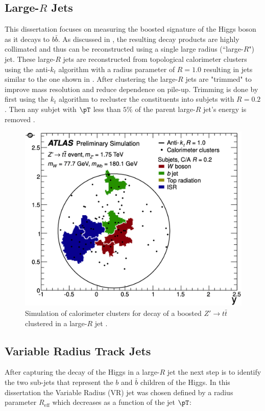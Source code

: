 \subsection{Large-$R$ Jets} \label{sec:objects:fatjet}
This dissertation focuses on measuring the boosted signature of the Higgs boson
as it decays to $b\bar{b}$.  As discussed in , the
resulting decay products are highly collimated and thus can be reconstructed
using a single large radius (``large-$R$") jet.  These large-$R$ jets are
reconstructed from topological calorimeter clusters using the anti-$k_{t}$
algorithm with a radius parameter of $R = 1.0$ resulting in jets similar to the
one shown in  \cite{Aaboud:2018kfi,
Aaboud:2017hdf}. After clustering the large-$R$ jets are "trimmed" to improve
mass resolution and reduce dependence on pile-up. Trimming is done by first
using the $k_{t}$ algorithm to recluster the constituents into subjets with
$R=0.2$.  Then any subjet with $\pT$ less than $5\%$ of the parent large-$R$
jet's energy is removed \cite{Krohn:2009th}.

\begin{figure}[!htbp]
  \centering
  \includegraphics[width=0.7\linewidth]{figures/objects/large_R_example}
  \caption{Simulation of calorimeter clusters for decay of a boosted $Z' \rightarrow t\bar{t}$ clustered in a large-$R$ jet \cite{ATLAS-CONF-2014-003}.}
  \label{sec:object:large_R_example}
\end{figure}

\subsection{Variable Radius Track Jets} \label {sec:objects:vrjets}

After capturing the decay of the Higgs in a large-$R$ jet the next step is to
identify the two sub-jets that represent the $b$ and $\bar{b}$ children of the
Higgs. In this dissertation the Variable Radius (VR) jet was chosen
\cite{Krohn:2009zg,ATL-PHYS-PUB-2017-010} defined by a radius parameter
$R_{\text{eff}}$ which decreases as a function of the jet $\pT$:

